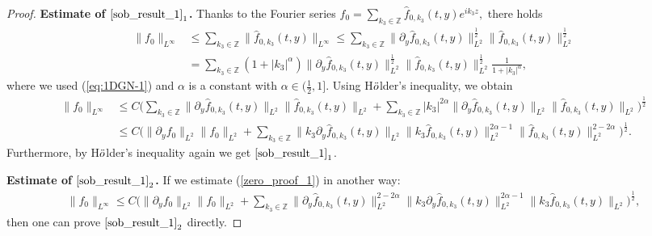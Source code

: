 \documentclass[12pt, reqno]{amsart}
\numberwithin{equation}{section}
\begin{document}
	\begin{proof}
		
		{\bf Estimate of $\eqref{sob_result_1}_1$.}
		Thanks to the Fourier series $f_0=\sum_{k_3\in \mathbb{Z}}\widehat{f}_{0,k_3}(t,y)e^{ik_3z},$ there holds
		\begin{equation*}
			\begin{aligned}
				\|f_0\|_{L^{\infty}}&\leq \sum_{k_3\in \mathbb{Z}}\|\widehat{f}_{0,k_3}(t,y)\|_{L^{\infty}}\leq 
				\sum_{k_3\in \mathbb{Z}}\|\partial_y\widehat{f}_{0,k_3}(t,y)\|^{\frac{1}{2}}_{L^{2}}
				\|\widehat{f}_{0,k_3}(t,y)\|^{\frac{1}{2}}_{L^{2}}	\\
				&=\sum_{k_3\in \mathbb{Z}}(1+|k_3|^{\alpha})
				\|\partial_y\widehat{f}_{0,k_3}(t,y)\|^{\frac{1}{2}}_{L^{2}}
				\|\widehat{f}_{0,k_3}(t,y)\|^{\frac{1}{2}}_{L^{2}}\frac{1}{1+|k_3|^{\alpha}},
			\end{aligned}
		\end{equation*}
		where we used (\ref{eq:1DGN-1}) and  $\alpha$ is a constant with $\alpha\in(\frac{1}{2},1].$
		Using H$\rm \ddot{o}$lder's inequality, we obtain 
		\begin{equation}\label{zero_proof_1}
			\begin{aligned}
				\|f_0\|_{L^{\infty}}
				&\leq C\Big(\sum_{k_3\in \mathbb{Z}}
				\|\partial_y\widehat{f}_{0,k_3}(t,y)\|_{L^{2}}
				\|\widehat{f}_{0,k_3}(t,y)\|_{L^{2}}
				+\sum_{k_3\in \mathbb{Z}}|k_3|^{2\alpha}
				\|\partial_y\widehat{f}_{0,k_3}(t,y)\|_{L^{2}}
				\|\widehat{f}_{0,k_3}(t,y)\|_{L^{2}}\Big)^{\frac{1}{2}}\\
				&\leq C\Big(\|\partial_yf_0\|_{L^2}\|f_0\|_{L^2}
				+\sum_{k_3\in \mathbb{Z}}
				\|k_3\partial_y\widehat{f}_{0,k_3}(t,y)\|_{L^{2}}
				\|k_3\widehat{f}_{0,k_3}(t,y)\|^{2\alpha-1}_{L^{2}}
				\|\widehat{f}_{0,k_3}(t,y)\|^{2-2\alpha}_{L^{2}}
				\Big)^{\frac{1}{2}}.
			\end{aligned}
		\end{equation}
		Furthermore, by  H$\rm \ddot{o}$lder's inequality again we get $\eqref{sob_result_1}_1$.
		
		{\bf Estimate of $\eqref{sob_result_1}_2$.}
		If we estimate (\ref{zero_proof_1}) in another way:
		\begin{equation*}
			\begin{aligned}
				\|f_0\|_{L^{\infty}}
				\leq C\Big(\|\partial_yf_0\|_{L^2}\|f_0\|_{L^2}
				+\sum_{k_3\in \mathbb{Z}}
				\|\partial_y\widehat{f}_{0,k_3}(t,y)\|_{L^{2}}^{2-2\alpha}
				\|k_3\partial_y\widehat{f}_{0,k_3}(t,y)\|^{2\alpha-1}_{L^{2}}
				\|k_3\widehat{f}_{0,k_3}(t,y)\|_{L^{2}}
				\Big)^{\frac{1}{2}},
			\end{aligned}
		\end{equation*}
		then one can prove $\eqref{sob_result_1}_2$ directly.
		

\end{proof}
\end{document}
